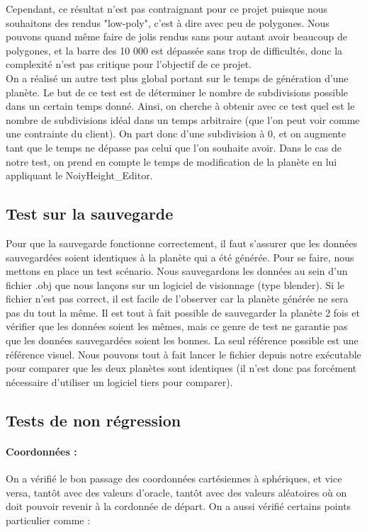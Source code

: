 \documentclass[a4paper]{article}
\begin{document}
Cependant, ce résultat n'est pas contraignant pour ce projet puisque nous souhaitons des rendus "low-poly", c'est à dire avec peu de polygones. Nous pouvons quand même faire de jolis rendus sans pour autant avoir beaucoup de polygones, et la barre des 10 000 est dépassée sans trop de difficultés, donc la complexité n'est pas critique pour l'objectif de ce projet.\\


On a réalisé un autre test plus global portant sur le temps de génération d'une planète.
Le but de ce test est de déterminer le nombre de subdivisions possible dans un certain temps donné. Ainsi, on cherche à obtenir avec ce test quel est le nombre de subdivisions idéal dans un temps arbitraire (que l'on peut voir comme une contrainte du client). On part donc d'une subdivision à 0, et on augmente tant que le temps ne dépasse pas celui que l'on souhaite avoir. Dans le cas de notre test, on prend en compte le temps de modification de la planète en lui appliquant le NoiyHeight\_Editor.

\subsection{Test sur la sauvegarde}

Pour que la sauvegarde fonctionne correctement, il faut s'assurer que les données sauvegardées soient identiques à la planète qui a été générée. Pour se faire, nous mettons en place un test scénario. Nous sauvegardons les données au sein d'un fichier .obj que nous lançons sur un logiciel de visionnage (type blender). Si le fichier n'est pas correct, il est facile de l'observer car la planète générée ne sera pas du tout la même. Il est tout à fait possible de sauvegarder la planète 2 fois et vérifier que les données soient les mêmes, mais ce genre de test ne garantie pas que les données sauvegardées soient les bonnes. La seul référence possible est une référence visuel. Nous pouvons tout à fait lancer le fichier depuis notre exécutable pour comparer que les deux planètes sont identiques (il n'est donc pas forcément nécessaire d'utiliser un logiciel tiers pour comparer).

\subsection{Tests de non régression}

\paragraph{Coordonnées : } On a vérifié le bon passage des coordonnées cartésiennes à sphériques, et vice versa, tantôt avec des valeurs d'oracle, tantôt avec des valeurs aléatoires où on doit pouvoir revenir à la cordonnée de départ.
On a aussi vérifié certains points particulier comme :
\end{document}
